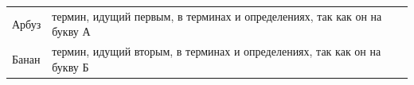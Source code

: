 
\noindent
\begin{tabular}{@{}l@{~—~}p{}@{}}
Арбуз & термин, идущий первым, в терминах и определениях, так как он на букву А \\
Банан & термин, идущий вторым, в терминах и определениях, так как он на букву Б \\
\end{tabular}

